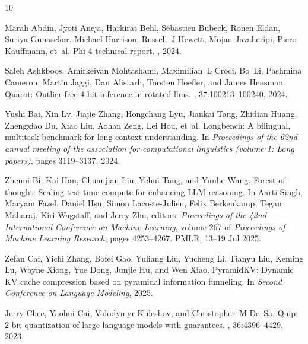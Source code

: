 \documentclass{llmxive}
\begin{document}
 
\begin{thebibliography}{10}

Marah Abdin, Jyoti Aneja, Harkirat Behl, S{\'e}bastien Bubeck, Ronen Eldan, Suriya Gunasekar, Michael Harrison, Russell~J Hewett, Mojan Javaheripi, Piero Kauffmann, et~al.
\newblock Phi-4 technical report.
, 2024.

Saleh Ashkboos, Amirkeivan Mohtashami, Maximilian~L Croci, Bo~Li, Pashmina Cameron, Martin Jaggi, Dan Alistarh, Torsten Hoefler, and James Hensman.
\newblock Quarot: Outlier-free 4-bit inference in rotated llms.
, 37:100213--100240, 2024.

Yushi Bai, Xin Lv, Jiajie Zhang, Hongchang Lyu, Jiankai Tang, Zhidian Huang, Zhengxiao Du, Xiao Liu, Aohan Zeng, Lei Hou, et~al.
\newblock Longbench: A bilingual, multitask benchmark for long context understanding.
\newblock In {\em Proceedings of the 62nd annual meeting of the association for computational linguistics (volume 1: Long papers)}, pages 3119--3137, 2024.

Zhenni Bi, Kai Han, Chuanjian Liu, Yehui Tang, and Yunhe Wang.
\newblock Forest-of-thought: Scaling test-time compute for enhancing {LLM} reasoning.
\newblock In Aarti Singh, Maryam Fazel, Daniel Hsu, Simon Lacoste-Julien, Felix Berkenkamp, Tegan Maharaj, Kiri Wagstaff, and Jerry Zhu, editors, {\em Proceedings of the 42nd International Conference on Machine Learning}, volume 267 of {\em Proceedings of Machine Learning Research}, pages 4253--4267. PMLR, 13--19 Jul 2025.

Zefan Cai, Yichi Zhang, Bofei Gao, Yuliang Liu, Yucheng Li, Tianyu Liu, Keming Lu, Wayne Xiong, Yue Dong, Junjie Hu, and Wen Xiao.
\newblock Pyramid{KV}: Dynamic {KV} cache compression based on pyramidal information funneling.
\newblock In {\em Second Conference on Language Modeling}, 2025.

Jerry Chee, Yaohui Cai, Volodymyr Kuleshov, and Christopher~M De~Sa.
\newblock Quip: 2-bit quantization of large language models with guarantees.
, 36:4396--4429, 2023.


\end{thebibliography}
\end{document}
